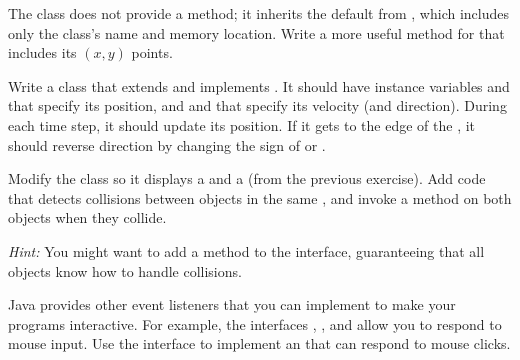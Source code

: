 \begin{exercise}
The  class does not provide a  method; it inherits the default  from , which includes only the class's name and memory location.
Write a more useful  method for  that includes its $(x, y)$ points.
\end{exercise}


\begin{exercise}
Write a class  that extends  and implements .
It should have instance variables  and  that specify its position, and  and  that specify its velocity (and direction).
During each time step, it should update its position.
If it gets to the edge of the , it should reverse direction by changing the sign of  or .
\end{exercise}


\begin{exercise}
Modify the  class so it displays a  and a  (from the previous exercise).
Add code that detects collisions between  objects in the same , and invoke a method on both objects when they collide.

{\em Hint:} You might want to add a method to the  interface, guaranteeing that all  objects know how to handle collisions.
\end{exercise}


\begin{exercise}
Java provides other event listeners that you can implement to make your programs interactive.
For example, the interfaces , , and  allow you to respond to mouse input.
Use the  interface to implement an  that can respond to mouse clicks.
\end{exercise}
